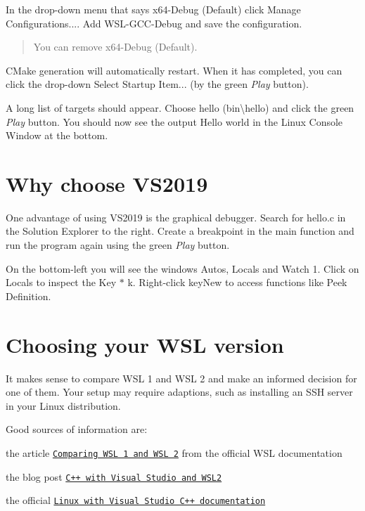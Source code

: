 In the drop-\/down menu that says {\ttfamily x64-\/\+Debug (Default)} click {\ttfamily Manage Configurations...}. Add {\ttfamily W\+S\+L-\/\+G\+C\+C-\/\+Debug} and save the configuration.

\begin{quote}
You can remove {\ttfamily x64-\/\+Debug (Default)}. \end{quote}


C\+Make generation will automatically restart. When it has completed, you can click the drop-\/down {\ttfamily Select Startup Item...} (by the green {\itshape Play} button).

A long list of targets should appear. Choose {\ttfamily hello (bin\textbackslash{}hello)} and click the green {\itshape Play} button. You should now see the output {\ttfamily Hello world} in the Linux Console Window at the bottom.\hypertarget{doc_tutorials_contributing-windows_md_autotoc_md3797}{}\section{Why choose V\+S2019}\label{doc_tutorials_contributing-windows_md_autotoc_md3797}
One advantage of using V\+S2019 is the graphical debugger. Search for {\ttfamily hello.\+c} in the Solution Explorer to the right. Create a breakpoint in the main function and run the program again using the green {\itshape Play} button.

On the bottom-\/left you will see the windows {\ttfamily Autos}, {\ttfamily Locals} and {\ttfamily Watch 1}. Click on {\ttfamily Locals} to inspect the {\ttfamily Key $\ast$ k}. Right-\/click {\ttfamily key\+New} to access functions like {\ttfamily Peek Definition}.\hypertarget{doc_tutorials_contributing-windows_md_autotoc_md3798}{}\section{Choosing your W\+S\+L version}\label{doc_tutorials_contributing-windows_md_autotoc_md3798}
It makes sense to compare W\+SL 1 and W\+SL 2 and make an informed decision for one of them. Your setup may require adaptions, such as installing an S\+SH server in your Linux distribution.

Good sources of information are\+:


\begin{DoxyItemize}
\item the article \href{https://docs.microsoft.com/en-us/windows/wsl/compare-versions}{\tt Comparing W\+SL 1 and W\+SL 2} from the official W\+SL documentation
\item the blog post \href{https://devblogs.microsoft.com/cppblog/c-with-visual-studio-and-wsl2/}{\tt C++ with Visual Studio and W\+S\+L2}
\item the official \href{https://docs.microsoft.com/en-us/cpp/linux/?view=msvc-160}{\tt Linux with Visual Studio C++ documentation}
\end{DoxyItemize}


